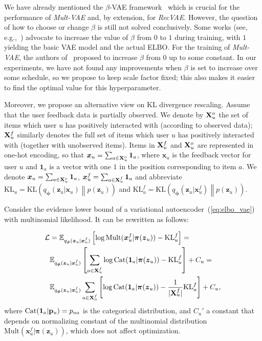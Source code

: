 \documentclass[sigconf,authorversion]{acmart}
\newcommand{\KL}[2]{\mathrm{KL}\left(#1 \middle\| #2\right)}
\def\XX{{\bf X}}
\def\bp{{\bf p}}
\def\bz{{\bf z}}
\def\bphi{{\boldsymbol{\phi}}}
\def\bpi{{\boldsymbol{\pi}}}
\def\bz{\boldsymbol{z}}
\def\bOne{\boldsymbol{1}}
\def\bx{\boldsymbol{x}}
\begin{document}
We have already mentioned the $\beta$-VAE framework~\cite{Higgins2017betaVAELB} which is crucial for the performance of \emph{Mult-VAE} and, by extension, for \emph{RecVAE}. However, the question of how to choose or change $\beta$ is still not solved conclusively. Some works (see, e.g.,~\cite{bowman2016generating}) advocate to increase the value of $\beta$ from $0$ to $1$ during training, with $1$ yielding the basic VAE model and the actual ELBO. For the training of \emph{Mult-VAE}, the authors of~\cite{liang2018variational} proposed to increase $\beta$ from $0$ up to some constant. In our experiments, we have not found any improvements when $\beta$ is set to increase over some schedule, so we propose to keep scale factor fixed; this also makes it easier to find the optimal value for this hyperparameter.

\def\klu{\mathrm{KL}_u}
\def\klf{\mathrm{KL}_u^f}

Moreover, we propose an alternative view on KL divergence rescaling. Assume that the user feedback data is partially observed. We denote by $\XX_u^o$ the set of items which user $u$ has positively interacted with (according to observed data); $\XX_u^f$ similarly denotes the full set of items which user $u$ has positively interacted with (together with unobserved items). Items in $\XX_u^f$ and $\XX_u^o$ are represented in one-hot encoding, so that $\bx_u = \sum_{a \in \XX_u^o}\bOne_a$, where $\bx_u$ is the feedback vector for user $u$ and $\bOne_a$ is a vector with one $1$ in the position corresponding to item $a$. We denote 
$\bx_u = \sum_{a \in \XX_u^o}\bOne_a$, $\bx_u^f = \sum_{a \in \XX_u^f}\bOne_a$ and abbreviate $\klu = \KL{q_{\bphi}(\bz_u|\bx_u)}{p(\bz_u)}$ and $\klf = \KL{q_{\bphi}(\bz_u|\bx_u^f)}{p(\bz_u)}$.

Consider the evidence lower bound of a variational autoencoder~(\ref{eq:elbo_vae}) with multinomial likelihood. It can be rewritten as follows:

\begin{equation}\label{eq:1}
\begin{aligned}
\mathcal{L} &=
  \mathbb{E}_{q_{\bphi}(\bz_u|\bx_u^f)}\left[\log \mathrm{Mult}(\bx_u^f|\bpi(\bz_u)) - \klf\right] = \\
  & \mathbb{E}_{q_{\bphi}(\bz_u|\bx_u^f)} \left[\sum_{a \in \XX_u^f} \log \mathrm{Cat}(\bOne_a|\bpi(\bz_u)) - \klf\right] + C_u =\\
  & \mathbb{E}_{q_{\bphi}(\bz_u|\bx_u^f)} \sum_{a \in \XX_u^f} \left[\log \mathrm{Cat}(\bOne_a|\bpi(\bz_u)) - \frac{1}{|\XX_u^f|} \klf\right] + C_u,
\end{aligned}
\end{equation}
where $\mathrm{Cat}(\bOne_a|\bp_u) = p_{ua}$
is the categorical distribution,
and $C_u'$ a constant that depends on normalizing constant of the multinomial distribution $\mathrm{Mult}(\bx_u^f|\bpi(\bz_u))$, which does not affect optimization.
\end{document}
